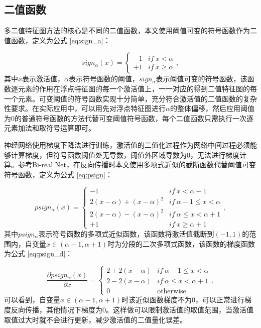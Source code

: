 \subsection{二值函数}

多二值特征图方法的核心是不同的二值函数，本文使用阈值可变的符号函数作为二值函数，定义为公式 \eqref{eq:sign_a}：

\begin{equation}
  \label{eq:sign_a}
  sign_\alpha(x) =
  \begin{cases}
    -1 & if \ x < \alpha \\
    +1 & if \ x \geq \alpha 
  \end{cases},
\end{equation}
其中$x$表示激活值，$\alpha$表示符号函数的阈值，$sign_\alpha$表示阈值可变的符号函数，该函数逐元素的作用在浮点特征图的每一个激活值上，一一对应的得到二值特征图的每一个元素。可变阈值的符号函数实现十分简单，充分符合激活值的二值函数的复杂性要求。在实际应用中，可以用先对浮点特征图进行$\alpha$的整体偏移，然后应用阈值为0的普通符号函数的方法代替可变阈值符号函数，每个二值函数只需执行一次逐元素加法和取符号运算即可。

神经网络使用梯度下降法进行训练，激活值的二值化过程作为网络中间过程必须能够计算梯度，但符号函数阈值处无导数，阈值外区域导数为0，无法进行梯度计算。参考Bi-real Net\cite{birealnet}，在反向传播时本文使用多项式近似的截断函数代替阈值可变符号函数，定义为公式 \eqref{eq:psign}：

\begin{equation}
  \label{eq:psign}
  psign_\alpha(x) = 
  \begin{cases}
    -1 & if \ x < \alpha - 1 \\
    2(x - \alpha) + (x - \alpha)^2 & if \ \alpha - 1 \leq x < \alpha \\
    2(x - \alpha) - (x - \alpha)^2 & if \ \alpha \leq x < \alpha + 1 \\
    +1 & if \ x \geq  \alpha + 1
  \end{cases},
\end{equation}
其中$psign_\alpha$表示符号函数的多项式近似函数，该函数将激活值截断到$(-1, 1)$的范围内，自变量$x \in (\alpha - 1, \alpha + 1)$时为分段的二次多项式函数，该函数的梯度函数为公式 \eqref{eq:psign_d}：

\begin{equation}
  \label{eq:psign_d}
  \frac{\partial psign_\alpha(x)}{\partial x} = 
  \begin{cases}
    2 + 2(x - \alpha) & if \ \alpha - 1 \leq x < \alpha \\
    2 - 2(x - \alpha) & if \ \alpha \leq x < \alpha + 1 \\
    0 & \text{otherwise}
  \end{cases},
\end{equation}
可以看到，自变量$x \in (\alpha - 1, \alpha + 1)$时该近似函数梯度不为0，可以正常进行梯度反向传播，其他情况下梯度为0。这样做可以限制激活值的取值范围，当激活值取值过大时就不会进行更新，减少激活值的二值量化误差。


